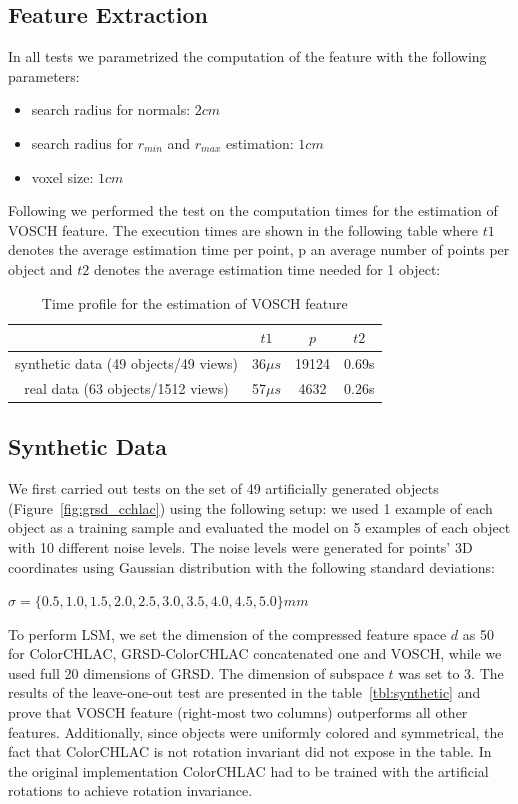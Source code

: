 \documentclass[conference]{sty/IEEEtran}
\begin{document}
\subsection{Feature Extraction}
\label{sec:feature_extraction}
In all tests we parametrized the computation of the feature with the following parameters:
\begin{itemize}
\item search radius for normals: $2cm$
\item search radius for $r_{min}$ and $r_{max}$ estimation: $1cm$
\item voxel size: $1cm$
\end{itemize}

Following we performed the test on the computation times for the estimation
of VOSCH feature. The execution times are shown in the following table where $t1$
denotes the average estimation time per point, p an average number of points per object
and $t2$ denotes the average estimation time needed for 1 object:
\begin{table}[ht]
\begin{center}
\begin{tabular}{|c|c|c|c|}
\hline
 & $t1$ & $p$ & $t2$ \\
\hline
synthetic data (49 objects/49 views) & 36$\mu s$ & 19124 & 0.69s \\
\hline
real data (63 objects/1512 views) & 57$\mu s$ & 4632 & 0.26s \\
\hline
\end{tabular}
\caption{Time profile for the estimation of VOSCH feature}
\label{tbl:timing}
\end{center}
\end{table}

\subsection{Synthetic Data}
We first carried out tests on the set of 49 artificially generated objects 
(Figure~\ref{fig:grsd_cchlac}) using the following setup: we used 1 example of 
each object as a training sample and evaluated the model on 5 examples of each object with 
10 different noise levels. The noise levels were generated for points' 3D coordinates 
using Gaussian distribution with the following standard deviations:\\
\begin{center}
$\sigma = \{0.5, 1.0, 1.5, 2.0, 2.5, 3.0, 3.5, 4.0, 4.5, 5.0\}mm$ 
\end{center}
To perform LSM, we set the dimension of the compressed feature space $d$ as 50 for ColorCHLAC, GRSD-ColorCHLAC concatenated one and VOSCH, while 
   we used full 20 dimensions of GRSD. The dimension of subspace $t$ was set to 3. 
The results of the leave-one-out test are presented in the table~\ref{tbl:synthetic}
and prove that VOSCH feature (right-most two columns) outperforms all other features.
Additionally, since objects were uniformly colored and symmetrical, the fact that ColorCHLAC 
is not rotation invariant did not expose in the table. In the original implementation ColorCHLAC 
had to be trained with the artificial rotations to achieve rotation invariance.
\end{document}
